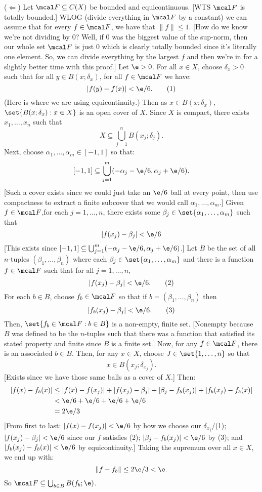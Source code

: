 \documentclass[class=article, crop=false]{standalone}
\renewcommand{\d}{\delta}
\renewcommand{\a}{\alpha}
\renewcommand{\b}{\beta}
\begin{document}
\begin{pf}
  ($\Leftarrow$) Let $\mcal F\subseteq C(X)$ be bounded and equicontinuous. [WTS $\mcal F$ is totally bounded.] WLOG (divide everything in $\mcal F$ by a constant) we can assume that for every $f \in \mcal F$, we have that $\|f\| \leq 1$. [How do we know we're not dividing by $0$? Well, if $0$ was the biggest value of the sup-norm, then our whole set $\mcal F$ is just $0$ which is clearly totally bounded since it's literally one element. So, we can divide everything by the largest $f$ and then we're in for a slightly better time with this proof.] Let $\e > 0$. For all $x \in X$, choose $\d_x > 0$ such that for all $y \in B(x;\d_x)$, for all $f \in \mcal F$ we have:
    \[
      |f(y)-f(x)| < \e/6. \tag{1}
    \]
  (Here is where we are using equicontinuity.) Then as $x \in B(x;\d_x)$,$\set{B(x;\d_x) : x \in X}$ is an open cover of $X$. Since $X$ is compact, there exists $x_1, \ldots, x_n$ such that
    \[
      X \subseteq \bigcup_{j=1}^{n} B(x_j;\d_j).
    \]
  Next, choose $\a_1,\ldots,\a_m \in [-1,1]$ so that:
    \[
      [-1,1] \subseteq \bigcup_{j=1}^{m} (-\a_j-\e/6, \a_j+\e/6).
    \]
  [Such a cover exists since we could just take an $\e/6$ ball at every point, then use compactness to extract a finite subcover that we would call $\a_1,\ldots,\a_m$.] Given $f \in \mcal F$,for each $j=1,\ldots,n$, there exists some $\b_j \in \set{\a_1,\ldots,\a_m}$ such that
    \[
      |f(x_j)-\b_j| < \e/6
    \]
  [This exists since $[-1,1] \subseteq \bigcup_{j=1}^{m} (-\a_j-\e/6, \a_j+\e/6)$.] Let $B$ be the set of all $n$-tuples $(\b_1,\ldots,\b_n)$ where each $\b_j \in \set{\a_1,\ldots,\a_m}$ and there is a function $f \in \mcal F$ such that for all $j=1,\ldots,n$,
    \[
      |f(x_j)-\b_j| < \e/6. \tag{2}
    \]
  For each $b \in B$, choose $f_b \in \mcal F$ so that if $b = (\b_1,\ldots,\b_n)$ then
    \[
      |f_b(x_j)-\b_j| < \e/6. \tag{3}
    \]
  Then, $\set{f_b \in \mcal F: b \in B}$ is a non-empty, finite set. [Nonempty because $B$ was defined to be the $n$-tuples such that there was a function that satisfied its stated property and finite since $B$ is a finite set.] Now, for any $f \in \mcal F$, there is an associated $b \in B$. Then, for any $x \in X$, choose $J \in \set{1,\ldots,n}$ so that
    \[
      x \in B(x_j;\d_{x_j}).
    \]
  [Exists since we have those same balls as a cover of $X$.] Then:
    \begin{align*}
      |f(x)-f_b(x)| &\leq |f(x)-f(x_j)| + |f(x_j) - \b_j| + |\b_j - f_b(x_j)| + |f_b(x_j)-f_b(x)| \\
      &< \e/6 + \e/6 + \e/6 + \e/6 \\
      &= 2\e/3
    \end{align*}
  [From first to last: $|f(x)-f(x_j)| < \e/6$ by how we choose our $\d_{x_j}$/(1); $|f(x_j) - \b_j| < \e/6$ since our $f$ satisfies (2); $|\b_j - f_b(x_j)| < \e/6$ by (3); and $|f_b(x_j)-f_b(x)|< \e/6$ by equicontinuity.] Taking the supremum over all $x \in X$, we end up with:
    \[
      \|f-f_b\| \leq 2\e/3 < \e.
    \]
  So $\mcal F \subseteq \bigcup_{b \in B}^{} B(f_b; \e)$.
\end{pf}
\end{document}
